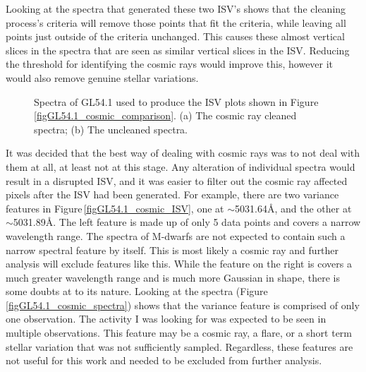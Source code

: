 Looking at the spectra that generated these two ISV's shows that the cleaning process's criteria will remove those points that fit the criteria, while leaving all points just outside of the criteria unchanged. This causes these almost vertical slices in the spectra that are seen as similar vertical slices in the ISV. Reducing the threshold for identifying the cosmic rays would improve this, however it would also remove genuine stellar variations.\\

\begin{figure}
	\hspace{-2cm}
	\captionsetup{width=.8\textwidth}
    \caption{Spectra of GL54.1 used to produce the ISV plots shown in Figure\,\ref{figGL54.1_cosmic_comparison}. (a) The cosmic ray cleaned spectra; (b) The uncleaned spectra.}
    \label{figCosmic_spectra}
\end{figure}

It was decided that the best way of dealing with cosmic rays was to not deal with them at all, at least not at this stage. Any alteration of individual spectra would result in a disrupted ISV, and it was easier to filter out the cosmic ray affected pixels after the ISV had been generated. For example, there are two variance features in Figure\,\ref{figGL54.1_cosmic_ISV}, one at $\sim$5031.64\AA, and the other at $\sim$5031.89\AA. The left feature is made up of only 5 data points and covers a narrow wavelength range. The spectra of M-dwarfs are not expected to contain such a narrow spectral feature by itself. This is most likely a cosmic ray and further analysis will exclude features like this. While the feature on the right is covers a much greater wavelength range and is much more Gaussian in shape, there is some doubts at to its nature. Looking at the spectra (Figure\,\ref{figGL54.1_cosmic_spectra}) shows that the variance feature is comprised of only one observation. The activity I was looking for was expected to be seen in multiple observations. This feature may be a cosmic ray, a flare, or a short term stellar variation that was not sufficiently sampled. Regardless, these features are not useful for this work and needed to be excluded from further analysis.\\
 
